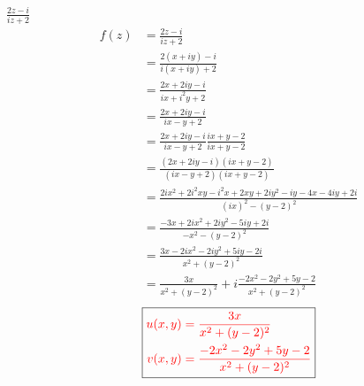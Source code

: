 \item[11.] $\frac{2z-i}{iz+2}$
\begin{align*}
    f(z) 
    &= \frac{2z-i}{iz+2} \\
    &= \frac{2(x+iy)-i}{i(x+iy)+2} \\
    &= \frac{2x+2iy-i}{ix+i^2y+2} \\
    &= \frac{2x+2iy-i}{ix-y+2} \\
    &= \frac{2x+2iy-i}{ix-y+2} \frac{ix+y-2}{ix+y-2}\\
    &= \frac{(2x+2iy-i)(ix+y-2)}{(ix-y+2)(ix+y-2)} \\
    &= \frac{2ix^2+2i^2xy-i^2x+2xy+2iy^2-iy-4x-4iy+2i}{(ix)^2-(y-2)^2} \\
    &= \frac{-3x+2ix^2+2iy^2-5iy+2i}{-x^2-(y-2)^2} \\
    &= \frac{3x-2ix^2-2iy^2+5iy-2i}{x^2+(y-2)^2} \\
    &= \frac{3x}{x^2+(y-2)^2} +i\frac{-2x^2-2y^2+5y-2}{x^2+(y-2)^2}
\end{align*}
\[
\boxed{
\textcolor{red}{
\begin{aligned}
u(x,y) &= \frac{3x}{x^2+(y-2)^2} \\
v(x,y) &= \frac{-2x^2-2y^2+5y-2}{x^2+(y-2)^2}
\end{aligned}
}
}
\]
